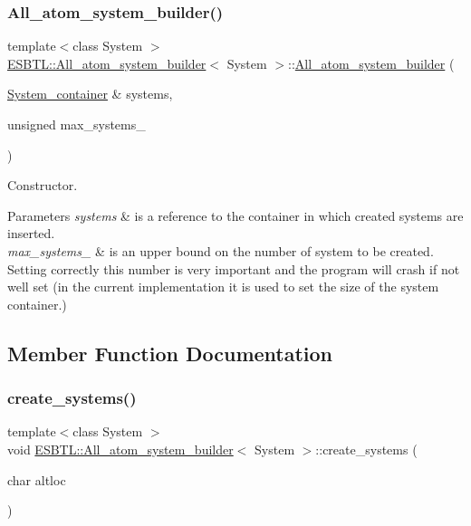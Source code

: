 \subsubsection{\texorpdfstring{All\+\_\+atom\+\_\+system\+\_\+builder()}{All\_atom\_system\_builder()}}
{\footnotesize\ttfamily template$<$class System $>$ \\
\hyperlink{classESBTL_1_1All__atom__system__builder}{E\+S\+B\+T\+L\+::\+All\+\_\+atom\+\_\+system\+\_\+builder}$<$ System $>$\+::\hyperlink{classESBTL_1_1All__atom__system__builder}{All\+\_\+atom\+\_\+system\+\_\+builder} (\begin{DoxyParamCaption}\item[{\hyperlink{classESBTL_1_1All__atom__system__builder_a31fb2f5199f57623e8c3582405d3c0bb}{System\+\_\+container} \&}]{systems,  }\item[{unsigned}]{max\+\_\+systems\+\_\+ }\end{DoxyParamCaption})\hspace{0.3cm}{\ttfamily [inline]}}

Constructor. 
\begin{DoxyParams}{Parameters}
{\em systems} & is a reference to the container in which created systems are inserted. \\
\hline
{\em max\+\_\+systems\+\_\+} & is an upper bound on the number of system to be created. Setting correctly this number is very important and the program will crash if not well set (in the current implementation it is used to set the size of the system container.) \\
\hline
\end{DoxyParams}


\subsection{Member Function Documentation}
\mbox{\label{classESBTL_1_1All__atom__system__builder_afc0da7bcb41d85c5092e97507a7acddc}} 
\subsubsection{\texorpdfstring{create\+\_\+systems()}{create\_systems()}}
{\footnotesize\ttfamily template$<$class System $>$ \\
void \hyperlink{classESBTL_1_1All__atom__system__builder}{E\+S\+B\+T\+L\+::\+All\+\_\+atom\+\_\+system\+\_\+builder}$<$ System $>$\+::create\+\_\+systems (\begin{DoxyParamCaption}\item[{char}]{altloc }\end{DoxyParamCaption})\hspace{0.3cm}{\ttfamily [inline]}}


